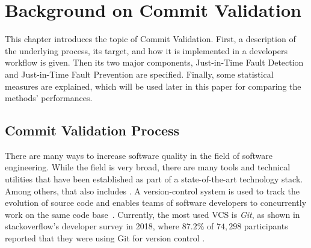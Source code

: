 

\section{Background on Commit Validation}
\label{sec:background}

This chapter introduces the topic of Commit Validation. 
First, a description of the underlying process, its target, and how it is implemented in a developers workflow is given.
Then its two major components, Just-in-Time Fault Detection and Just-in-Time Fault Prevention are specified. Finally, some statistical measures are explained, which will be used later in this paper for comparing the methods' performances.


\subsection{Commit Validation Process}
\label{sec:cvprocess}



There are many ways to increase software quality in the field of software engineering. While the field is very broad, there are many tools and technical utilities that have been established as part of a state-of-the-art technology stack. Among others, that also includes . A version-control system is used to track the evolution of source code and enables teams of software developers to concurrently work on the same code base~\cite{Chacon:2014:PG:2695634}. Currently, the most used VCS is \textit{Git}, as shown in stackoverflow's developer survey in 2018, where $87.2\%$ of $74,298$ participants reported that they were using Git for version control \cite{Stackoverflow}.


